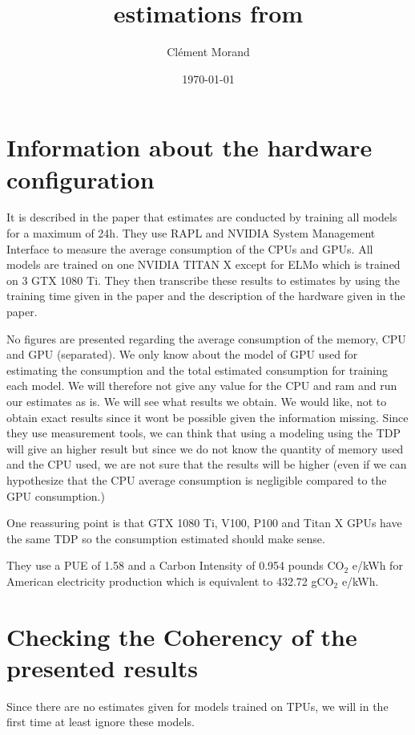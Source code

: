 \documentclass[11pt]{article}
\author{Clément Morand}
\date{\today}
\title{estimations from \cite{Strubell2019energy}}
\begin{document}
\maketitle
\tableofcontents

\label{sec:strubell}
\section{Information about the hardware configuration}
\label{sec:orgd9accb7}

It is described in the paper that estimates are conducted by training
all models for a maximum of 24h. They use RAPL and NVIDIA System
Management Interface to measure the average consumption of the CPUs and
GPUs. 
All models are trained on one NVIDIA TITAN X except for ELMo
which is trained on 3 GTX 1080 Ti.
They then transcribe these results to estimates by using the training
time given in the paper and the description of the hardware given in
the paper.

No figures are presented regarding the average consumption of the
memory, CPU and GPU (separated). We only know about the model of GPU used for
estimating the consumption and the total estimated consumption for
training each model. We will therefore not give any value for
the CPU and ram and run our estimates as is. We will see what results
we obtain. We would like, not to obtain exact results since it wont be
possible given the information missing. Since they use measurement
tools, we can think that using a modeling using the \gls{TDP} will give
an higher result but since we do not know the quantity of memory used
and the CPU used, we are not sure that the results will be higher
(even if we can hypothesize that the CPU average consumption is
negligible compared to the GPU consumption.)

One reassuring point is that GTX 1080 Ti, V100, P100 and Titan X GPUs have the same
\gls{TDP} so the consumption estimated should make sense.

They use a \gls{PUE} of 1.58 and a Carbon Intensity of 0.954 pounds CO\(_{\text{2}}\)
e/kWh for American electricity production which is equivalent to
432.72 gCO\(_{\text{2}}\) e/kWh.

\section{Checking the Coherency of the presented results}
\label{sec:org445ce4e}

Since there are no estimates given for models trained on TPUs, we will
in the first time at least ignore these models.
\end{document}
